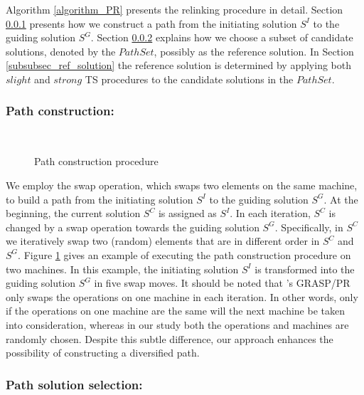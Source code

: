 \documentclass[authoryear,12pt]{elsarticle}
\begin{document}
Algorithm \ref{algorithm_PR} presents the relinking procedure in detail. Section \ref{subsubsec_path_construction} presents how we construct a path from the initiating solution $S^{I}$ to the guiding solution $S^{G}$. Section \ref{subsubsec_path_solution} explains how we choose a subset of candidate solutions, denoted by the $PathSet$, possibly as the reference solution. In Section \ref{subsubsec_ref_solution} the reference solution is determined by applying both $slight$ and $strong$ TS procedures to the candidate solutions in the $PathSet$.

\subsubsection{Path construction:}
\label{subsubsec_path_construction}

\begin{figure}[!htbp]
  \centering{}\\
  \centering\caption{Path construction procedure}\label{fig_pathconstruction}
\end{figure}

We employ the swap operation, which swaps two elements on the same machine, to build a path from the initiating solution $S^{I}$ to the guiding solution $S^{G}$. At the beginning, the current solution $S^{C}$ is assigned as $S^{I}$. In each iteration, $S^{C}$ is changed by a swap operation towards the guiding solution $S^{G}$. Specifically, in $S^{C}$ we iteratively swap two (random) elements that are in different order in $S^{C}$ and $S^{G}$. Figure \ref{fig_pathconstruction} gives an example of executing the path construction procedure on two machines. In this example, the initiating solution $S^{I}$ is transformed into the guiding solution $S^{G}$ in five swap moves. It should be noted that \cite{Aiex2003GRASPwithPR}'s GRASP/PR only swaps the operations on one machine in each iteration. In other words, only if the operations on one machine are the same will the next machine be taken into consideration, whereas in our study both the operations and machines are randomly chosen. Despite this subtle difference, our approach enhances the possibility of constructing a diversified path.

\subsubsection{Path solution selection:}
\label{subsubsec_path_solution}
\end{document}
